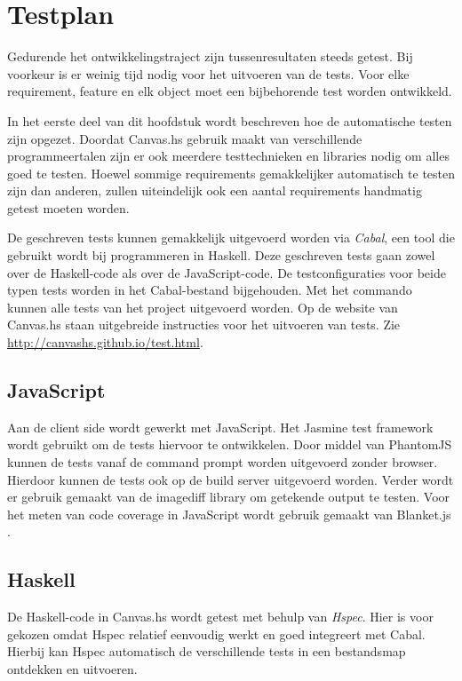 \chapter{Testplan} \label{hoofdstuk:testplan}
Gedurende het ontwikkelingstraject zijn tussenresultaten steeds getest. Bij voorkeur is er weinig tijd nodig voor het uitvoeren van de tests. Voor elke requirement, feature en elk object moet een bijbehorende test worden ontwikkeld.

In het eerste deel van dit hoofdstuk wordt beschreven hoe de automatische testen zijn opgezet. Doordat Canvas.hs gebruik maakt van verschillende programmeertalen zijn er ook meerdere testtechnieken en libraries nodig om alles goed te testen. Hoewel sommige requirements gemakkelijker automatisch te testen zijn dan anderen, zullen uiteindelijk ook een aantal requirements handmatig getest moeten worden.

De geschreven tests kunnen gemakkelijk uitgevoerd worden via \emph{Cabal}, een tool die gebruikt wordt bij programmeren in Haskell. Deze geschreven tests gaan zowel over de Haskell-code als over de JavaScript-code. De testconfiguraties voor beide typen tests worden in het Cabal-bestand bijgehouden. Met het commando  kunnen alle tests van het project uitgevoerd worden. Op de website van Canvas.hs staan uitgebreide instructies voor het uitvoeren van tests. Zie \url{http://canvashs.github.io/test.html}.

\section{JavaScript} 
Aan de client side wordt gewerkt met JavaScript. Het Jasmine \cite{Jasmine} test framework wordt gebruikt om de tests hiervoor te ontwikkelen. Door middel van PhantomJS \cite{PhantomJS} kunnen de tests vanaf de command prompt worden uitgevoerd zonder browser. Hierdoor kunnen de tests ook op de build server uitgevoerd worden. Verder wordt er gebruik gemaakt van de imagediff \cite{imagediff} library om getekende output te testen. Voor het meten van code coverage in JavaScript wordt gebruik gemaakt van Blanket.js \cite{Blanket.js}.

\section{Haskell}
De Haskell-code in Canvas.hs wordt getest met behulp van \emph{Hspec}\cite{Hspec}. Hier is voor gekozen omdat Hspec relatief eenvoudig werkt en goed integreert met Cabal. Hierbij kan Hspec automatisch de verschillende tests in een bestandsmap ontdekken en uitvoeren.

